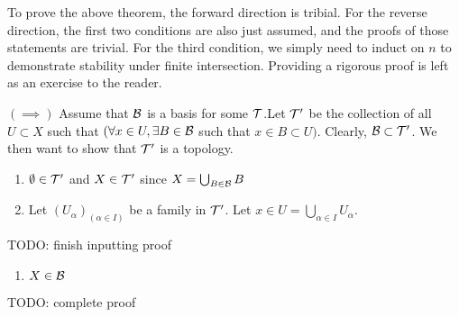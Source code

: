 To prove the above theorem, the forward direction is tribial. For the reverse direction, the first two conditions are also just assumed, and the proofs of those statements are trivial. For the third condition, we simply need to induct on $n$ to demonstrate stability under finite intersection. Providing a rigorous proof is left as an exercise to the reader.


\begin{myproof}
	$(\implies)$ Assume that $\mathcal{B}$ is a basis for some $\mathcal{T}$.Let $\mathcal{T}'$ be the collection of all $U\subset X$ such that $(\forall x\in U, \exists B\in\mathcal{B}$ such that $x\in B\subset U)$. Clearly, $\mathcal{B}\subset\mathcal{T}'$. We then want to show that $\mathcal{T}'$ is a topology.
	\begin{enumerate}
		\item $\emptyset\in\mathcal{T}'$ and $X\in\mathcal{T}'$ since $X = \bigcup_{B\in\mathcal{B}}B$
		\item Let $(U_\alpha)_(\alpha\in I)$ be a family in $\mathcal{T}'$. Let $x\in U = \bigcup_{\alpha\in I}U_\alpha$.
	\end{enumerate}

	TODO: finish inputting proof
\end{myproof}


\begin{myproof}
	\begin{enumerate}
		\item $X\in\mathcal{B}$
	\end{enumerate}

	TODO: complete proof
\end{myproof}

